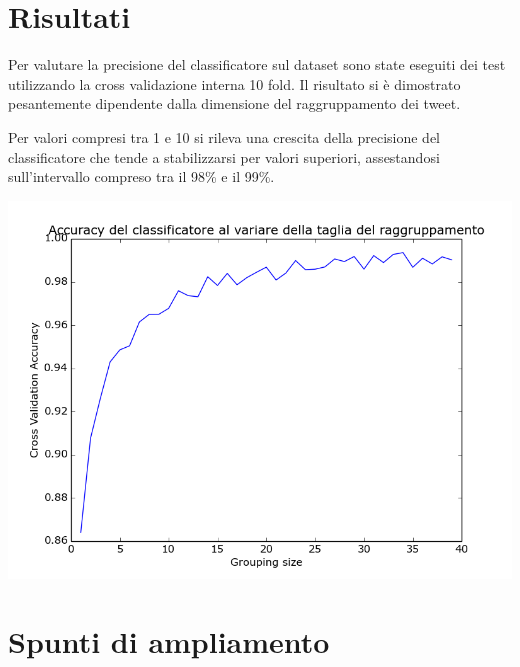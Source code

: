 \documentclass{article}
\begin{document}
\section{Risultati} 

Per valutare la precisione del classificatore sul dataset sono state eseguiti dei test utilizzando la cross validazione interna 10 fold. Il risultato si è dimostrato pesantemente dipendente dalla dimensione del raggruppamento dei tweet. 

Per valori compresi tra 1 e 10 si rileva una crescita della precisione del classificatore che tende a stabilizzarsi per valori superiori, assestandosi sull'intervallo compreso tra il 98\% e il 99\%.

\includegraphics[width=\linewidth]{grouping.png}




\section{Spunti di ampliamento}

\nocite{*}
\printbibliography
\end{document}
